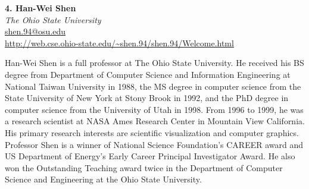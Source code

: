 \documentclass[preprint,journal]{vgtc}       %
\newcommand{\addverticalspace}{\vspace{3mm}}
\begin{document}
\noindent \textbf{4. Han-Wei Shen}\\
\emph{The Ohio State University}\\
\href{mailto:shen.94@osu.edu}{shen.94@osu.edu}\\
\url{http://web.cse.ohio-state.edu/~shen.94/shen.94/Welcome.html}

\addverticalspace
Han-Wei Shen is a full professor at The Ohio State University. He received his BS degree from Department of Computer Science and Information Engineering at National Taiwan University in 1988, the MS degree in computer science from the State University of New York at Stony Brook in 1992, and the PhD degree in computer science from the University of Utah in 1998. From 1996 to 1999, he was a research scientist at NASA Ames Research Center in Mountain View California. His primary research interests are scientific visualization and computer graphics. Professor Shen is a winner of National Science Foundation's CAREER award and US Department of Energy's Early Career Principal Investigator Award. He also won the Outstanding Teaching award twice in the Department of Computer Science and Engineering at the Ohio State University.

\printbibliography[title={Relevant Publications},category=Shen]

\addverticalspace



% 
% 
\end{document}
